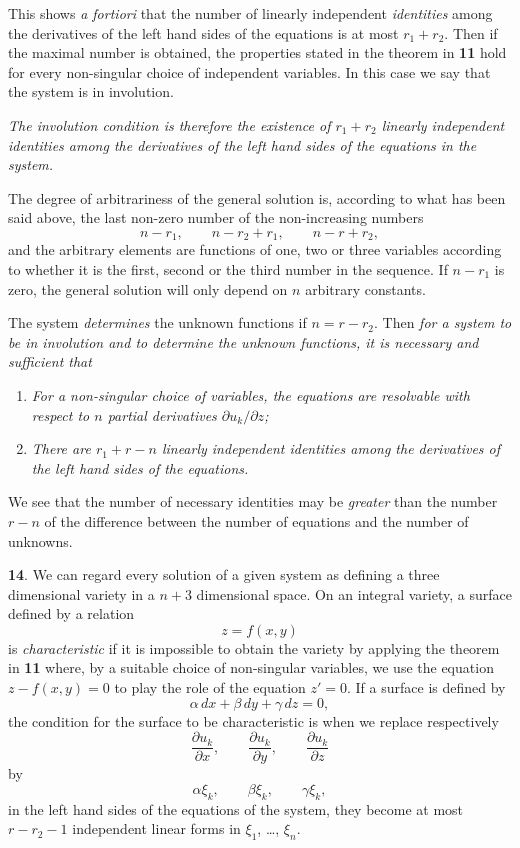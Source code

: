 \documentclass[leqno,11pt]{article}
\newcommand{\pd}{\partial}
\theoremstyle{shape1}
\theoremstyle{shape0}
\theoremstyle{shape2}
\theoremstyle{definition}
\begin{document}
This shows \emph{a fortiori} that the number of linearly independent \emph{identities} among the derivatives of the left hand sides of the equations is at most $r_{1}+r_{2}$. Then if the maximal number is obtained, the properties stated in the theorem in \textsection\textbf{11} hold for every non-singular choice of independent variables. In this case we say that the system is in involution.

\emph{The involution condition is therefore the existence of $r_{1}+r_{2}$ linearly independent identities among the derivatives of the left hand sides of the equations in the system.}

The degree of arbitrariness of the general solution is, according to what has been said above, the last non-zero number of the non-increasing numbers
\[
n-r_{1},\qquad n-r_{2}+r_{1},\qquad n-r+r_{2},
\]
and the arbitrary elements are functions of one, two or three variables according to whether it is the first, second or the third number in the sequence. If $n-r_{1}$ is zero, the general solution will only depend on $n$ arbitrary constants.

The system \emph{determines} the unknown functions if $n=r-r_{2}$. Then \emph{for a system to be in involution and to determine the unknown functions, it is necessary and sufficient that}
\begin{enumerate}
\item \emph{For a non-singular choice of variables, the equations are resolvable with respect to $n$ partial derivatives  $\pd u_{k}/\pd z$;}
\item \emph{There are $r_{1}+r-n$ linearly independent identities among the derivatives of the left hand sides of the equations.}
\end{enumerate}

We see that the number of necessary identities may be \emph{greater} than the number $r-n$ of the difference between the number of equations and the number of unknowns.

\vspace{12pt} 

\textbf{14}. We can regard every solution of a given system as defining a three dimensional variety in a $n+3$ dimensional space. On an integral variety, a surface defined by a relation
\[
z=f(x,y)
\]
is \emph{characteristic} if it is impossible to obtain the variety by applying the theorem in \textsection\textbf{11} where, by a suitable choice of non-singular variables, we use the equation $z-f(x,y)=0$ to play the role of the equation $z'=0$. If a surface is defined by
\[
\alpha\,dx+\beta\,dy+\gamma\,dz=0,
\]
the condition for the surface to be characteristic is when we replace respectively
\[
\frac{\pd u_{k}}{\pd x},\qquad\frac{\pd u_{k}}{\pd y},\qquad\frac{\pd u_{k}}{\pd z}
\] 
by
\[
\alpha\xi_{k},\qquad \beta\xi_{k},\qquad\gamma\xi_{k},
\]
in the left hand sides of the equations of the system, they become at most $r-r_{2}-1$ independent linear forms in $\xi_{1}$, \dots , $\xi_{n}$.
\end{document}
